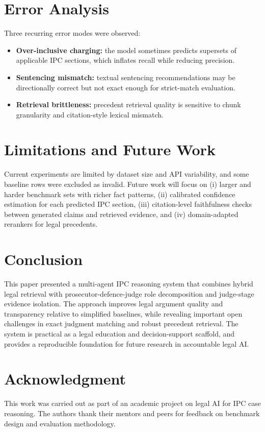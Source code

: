 \documentclass[conference]{IEEEtran}
\begin{document}
\FloatBarrier
\section{Error Analysis}
Three recurring error modes were observed:
\begin{itemize}
\item \textbf{Over-inclusive charging:} the model sometimes predicts supersets of applicable IPC sections, which inflates recall while reducing precision.
\item \textbf{Sentencing mismatch:} textual sentencing recommendations may be directionally correct but not exact enough for strict-match evaluation.
\item \textbf{Retrieval brittleness:} precedent retrieval quality is sensitive to chunk granularity and citation-style lexical mismatch.
\end{itemize}

\section{Limitations and Future Work}
Current experiments are limited by dataset size and API variability, and some baseline rows were excluded as invalid. Future work will focus on (i) larger and harder benchmark sets with richer fact patterns, (ii) calibrated confidence estimation for each predicted IPC section, (iii) citation-level faithfulness checks between generated claims and retrieved evidence, and (iv) domain-adapted rerankers for legal precedents.

\section{Conclusion}
This paper presented a multi-agent IPC reasoning system that combines hybrid legal retrieval with prosecutor-defence-judge role decomposition and judge-stage evidence isolation. The approach improves legal argument quality and transparency relative to simplified baselines, while revealing important open challenges in exact judgment matching and robust precedent retrieval. The system is practical as a legal education and decision-support scaffold, and provides a reproducible foundation for future research in accountable legal AI.

\section*{Acknowledgment}
This work was carried out as part of an academic project on legal AI for IPC case reasoning. The authors thank their mentors and peers for feedback on benchmark design and evaluation methodology.
\end{document}
